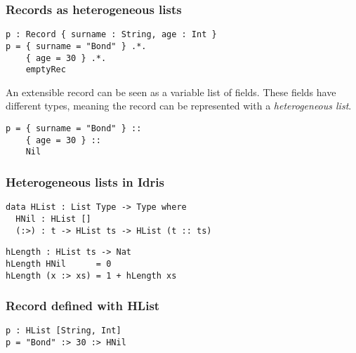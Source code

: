 \documentclass{beamer}
\begin{document}
\begin{frame}[fragile]
\frametitle{Records as heterogeneous lists}

\begin{example}
\begin{verbatim}
p : Record { surname : String, age : Int }
p = { surname = "Bond" } .*.
    { age = 30 } .*.
    emptyRec
\end{verbatim}
\end{example}

\pause

An extensible record can be seen as a variable list of fields. These fields have different types, meaning the record can be represented with a \textit{heterogeneous list}.

\pause

\begin{example}
\begin{verbatim}
p = { surname = "Bond" } ::
    { age = 30 } ::
    Nil
\end{verbatim}
\end{example}

\end{frame}

\begin{frame}[fragile]
\frametitle{Heterogeneous lists in Idris}

\begin{definition}
\begin{verbatim}
data HList : List Type -> Type where
  HNil : HList []
  (:>) : t -> HList ts -> HList (t :: ts)
\end{verbatim}
\end{definition}

\pause

\begin{definition}
\begin{verbatim}
hLength : HList ts -> Nat
hLength HNil      = 0
hLength (x :> xs) = 1 + hLength xs
\end{verbatim}
\end{definition}

\end{frame}

\begin{frame}[fragile]
\frametitle{Record defined with HList}

\begin{example}
\begin{verbatim}
p : HList [String, Int]
p = "Bond" :> 30 :> HNil
\end{verbatim}
\end{example}

\end{frame}
\end{document}
